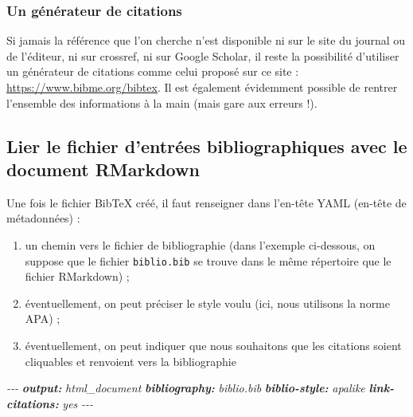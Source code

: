\documentclass[
  11pt,
]{book}
\newenvironment{Shaded}{\begin{snugshade}}{\end{snugshade}}
\newcommand{\AnnotationTok}[1]{\textcolor[rgb]{0.56,0.35,0.01}{\textbf{\textit{#1}}}}
\newcommand{\CommentTok}[1]{\textcolor[rgb]{0.56,0.35,0.01}{\textit{#1}}}
\providecommand{\tightlist}{%
  \setlength{\itemsep}{0pt}\setlength{\parskip}{0pt}}
\numberwithin{equation}{section}
\numberwithin{countremarque}{section}
\begin{document}
\hypertarget{un-guxe9nuxe9rateur-de-citations}{%
\subsubsection{Un générateur de citations}\label{un-guxe9nuxe9rateur-de-citations}}

Si jamais la référence que l'on cherche n'est disponible ni sur le site du journal ou de l'éditeur, ni sur crossref, ni sur Google Scholar, il reste la possibilité d'utiliser un générateur de citations comme celui proposé sur ce site : \url{https://www.bibme.org/bibtex}. Il est également évidemment possible de rentrer l'ensemble des informations à la main (mais gare aux erreurs !).

\hypertarget{lier-le-fichier-dentruxe9es-bibliographiques-avec-le-document-rmarkdown}{%
\subsection{Lier le fichier d'entrées bibliographiques avec le document RMarkdown}\label{lier-le-fichier-dentruxe9es-bibliographiques-avec-le-document-rmarkdown}}

Une fois le fichier BibTeX créé, il faut renseigner dans l'en-tête YAML (en-tête de métadonnées) :

\begin{enumerate}
\def\labelenumi{\arabic{enumi}.}
\tightlist
\item
  un chemin vers le fichier de bibliographie (dans l'exemple ci-dessous, on suppose que le fichier \texttt{biblio.bib} se trouve dans le même répertoire que le fichier RMarkdown) ;
\item
  éventuellement, on peut préciser le style voulu (ici, nous utilisons la norme APA) ;
\item
  éventuellement, on peut indiquer que nous souhaitons que les citations soient cliquables et renvoient vers la bibliographie
\end{enumerate}

\begin{Shaded}
\begin{Highlighting}[]
\CommentTok{{-}{-}{-}}
\AnnotationTok{output:}\CommentTok{ html\_document}
\AnnotationTok{bibliography:}\CommentTok{ biblio.bib}
\AnnotationTok{biblio{-}style:}\CommentTok{ apalike}
\AnnotationTok{link{-}citations:}\CommentTok{ yes}
\CommentTok{{-}{-}{-}}
\end{Highlighting}
\end{Shaded}
\end{document}
